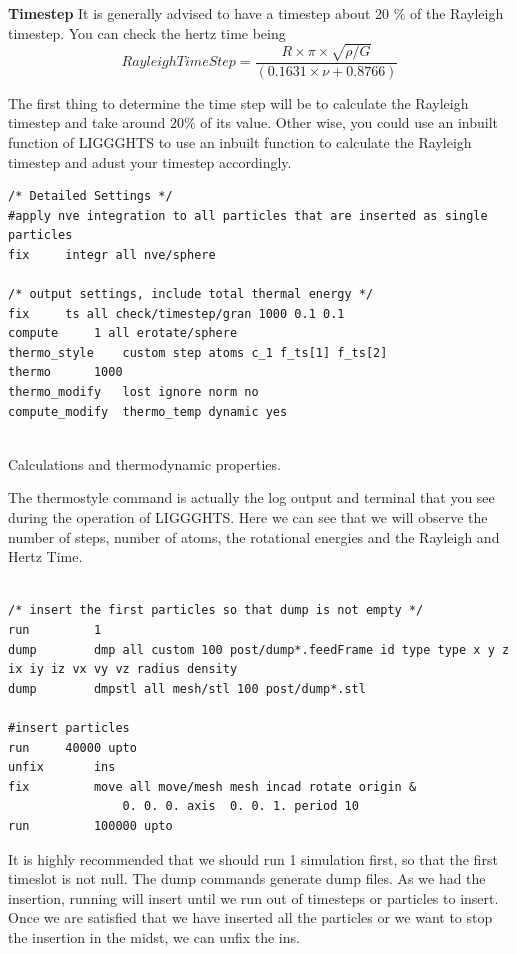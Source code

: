\documentclass{tufte-book} %
\begin{document}
\textbf{Timestep} It is generally advised to have a timestep about 20 \% of the Rayleigh timestep. You can check the hertz time being
$$ Rayleigh Time Step =  \frac{R\times\pi\times\sqrt{\rho/G}}{(0.1631\times\nu + 0.8766)} $$

The first thing to determine the time step will be to calculate the Rayleigh timestep and take around 20\% of its value. Other wise, you could use an inbuilt function of LIGGGHTS to use an inbuilt function to calculate the Rayleigh timestep and adust your timestep accordingly.


\begin{verbatim}
/* Detailed Settings */
#apply nve integration to all particles that are inserted as single particles
fix		integr all nve/sphere

/* output settings, include total thermal energy */
fix		ts all check/timestep/gran 1000 0.1 0.1
compute		1 all erotate/sphere
thermo_style	custom step atoms c_1 f_ts[1] f_ts[2]  
thermo		1000
thermo_modify	lost ignore norm no
compute_modify	thermo_temp dynamic yes


\end{verbatim}

 Calculations and thermodynamic properties.
 
The thermostyle command is actually the log output and terminal that you see during the operation of LIGGGHTS. Here we can see that we will observe the number of steps, number of atoms, the rotational energies and the Rayleigh and Hertz Time.
\begin{verbatim}

/* insert the first particles so that dump is not empty */
run			1
dump		dmp all custom 100 post/dump*.feedFrame id type type x y z ix iy iz vx vy vz radius density  
dump 		dmpstl all mesh/stl 100 post/dump*.stl

#insert particles
run		40000 upto
unfix		ins
fix 		move all move/mesh mesh incad rotate origin &
                0. 0. 0. axis  0. 0. 1. period 10
run 		100000 upto 

\end{verbatim}
It is highly recommended that we should run 1 simulation first, so that the first timeslot is not null.
The dump commands generate dump files.
As we had the insertion, running will insert until we run out of timesteps or particles to insert. Once we are satisfied  that we have inserted all the particles or we want to stop the insertion in the midst, we can unfix the ins.
\end{document}
